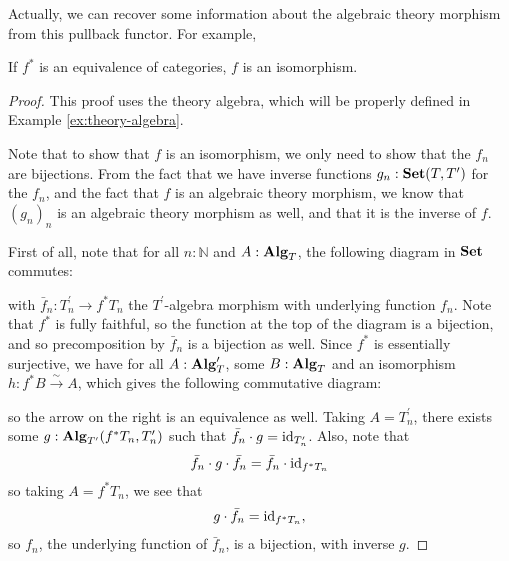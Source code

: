 Actually, we can recover some information about the algebraic theory morphism from this pullback functor. For example,
\begin{lemma}\label{lem:algebra-pullback-equivalence}
  If $ f^* $ is an equivalence of categories, $ f $ is an isomorphism.
\end{lemma}
\begin{proof}
  This proof uses the theory algebra, which will be properly defined in Example \ref{ex:theory-algebra}.

  Note that to show that $ f $ is an isomorphism, we only need to show that the $ f_n $ are bijections. From the fact that we have inverse functions $ g_n : \mathbf{Set}(T, T^\prime) $ for the $ f_n $, and the fact that $ f $ is an algebraic theory morphism, we know that $ (g_n)_n $ is an algebraic theory morphism as well, and that it is the inverse of $ f $.

  First of all, note that for all $ n : \mathbb N $ and $ A : \mathbf{Alg}_{T} $, the following diagram in $ \mathbf{Set} $ commutes:
  \begin{center}
  \end{center}
  with $ \bar f_n: T^\prime_n \to f^* T_n $ the $ T^\prime $-algebra morphism with underlying function $ f_n $. Note that $ f^* $ is fully faithful, so the function at the top of the diagram is a bijection, and so precomposition by $ \bar f_n $ is a bijection as well. Since $ f^* $ is essentially surjective, we have for all $ A : \mathbf{Alg}_{T}^\prime $, some $ B : \mathbf{Alg}_{T} $ and an isomorphism $ h: f^* B \xrightarrow \sim A $, which gives the following commutative diagram:
  \begin{center}
  \end{center}
  so the arrow on the right is an equivalence as well. Taking $ A = T^\prime_n $, there exists some $ g: \mathbf{Alg}_{T^\prime}(f^* T_n, T^\prime_n) $ such that $ \bar f_n \cdot g = \text{id}_{T^\prime_n} $. Also, note that
  \[ \bar f_n \cdot g \cdot \bar f_n = \bar f_n \cdot \text{id}_{f^* T_n} \]
  so taking $ A = f^* T_n $, we see that
  \[ g \cdot \bar f_n = \text{id}_{f^* T_n}, \]
  so $ f_n $, the underlying function of $ \bar f_n $, is a bijection, with inverse $ g $.
\end{proof}

